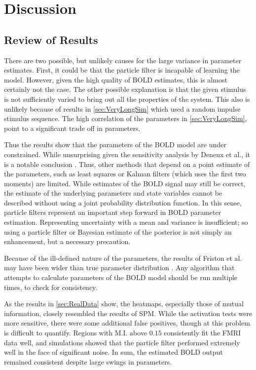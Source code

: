 \chapter{Discussion}
\label{sec:Discussion}
\section{Review of Results}
There are two possible, but unlikely causes for the large variance in
parameter estimates. First, it could be that the particle filter is
incapable of learning the model. However, given the high quality
of BOLD estimates, this is almost certainly not the case. The other 
possible explanation is that the given stimulus is not sufficiently
varied to bring out all the properties of the system. This also is unlikely
because of results in \autoref{sec:VeryLongSim} which used a random impulse
stimulus sequence. The high correlation of the parameters in \autoref{sec:VeryLongSim},
point to a significant trade off in parameters. 

Thus the results show that the parameters of the BOLD model are under
constrained. While unsurprising given the sensitivity analysis by Deneux et al.,
it is a notable conclusion \cite{Deneux2006}. Thus, other methods
that depend on a point estimate of the parameters, such as least squares 
or Kalman filters (which uses the first two moments) are limited. While estimates of
the  BOLD signal may still be correct, the estimate
of the underlying parameters and state variables cannot be described without using
a joint probability distribution function. In this sense, particle 
filters represent an important step forward in BOLD parameter 
estimation. Representing uncertainty with a mean
and variance is insufficient; so using a particle filter
or Bayesian estimate of the posterior is not simply an enhancement, 
but a necessary precaution.

Because of the ill-defined nature of the parameters, the results 
of Friston et al. may have been wider than true parameter distribution
\cite{Friston2002}. Any algorithm that attempts to calculate parameters
of the BOLD model should be run multiple times, to check for consistency.

As the results in \autoref{sec:RealData} show, the heatmaps, especially
those of mutual information, closely resembled the results of SPM. While the activation
tests were more sensitive, there were some additional false positives, 
though at this problem is difficult to quantify. Regions with M.I. above 
$0.15$ consistently fit the FMRI data well, and simulations showed that
the particle filter performed extremely well in the face of significant
noise. In sum, the estimated BOLD output remained consistent despite
large swings in parameters.

